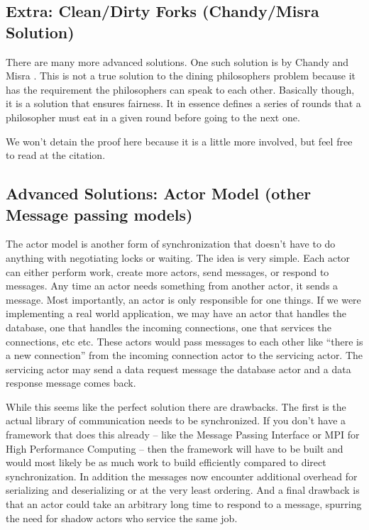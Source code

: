 \subsection{Extra: Clean/Dirty Forks (Chandy/Misra Solution)}

There are many more advanced solutions. One such solution is by Chandy and Misra \cite{Chandy:1984:DPP:1780.1804}. This is not a true solution to the dining philosophers problem because it has the requirement the philosophers can speak to each other. Basically though, it is a solution that ensures fairness. It in essence defines a series of rounds that a philosopher must eat in a given round before going to the next one.

We won't detain the proof here because it is a little more involved, but feel free to read at the citation.

\subsection{Advanced Solutions: Actor Model (other Message passing models)}

The actor model is another form of synchronization that doesn't have to do anything with negotiating locks or waiting. The idea is very simple. Each actor can either perform work, create more actors, send messages, or respond to messages. Any time an actor needs something from another actor, it sends a message. Most importantly, an actor is only responsible for one things.
If we were implementing a real world application, we may have an actor that handles the database, one that handles the incoming connections, one that services the connections, etc etc.
These actors would pass messages to each other like ``there is a new connection'' from the incoming connection actor to the servicing actor.
The servicing actor may send a data request message the database actor and a data response message comes back.

While this seems like the perfect solution there are drawbacks.
The first is the actual library of communication needs to be synchronized.
If you don't have a framework that does this already -- like the Message Passing Interface or MPI for High Performance Computing -- then the framework will have to be built and would most likely be as much work to build efficiently compared to direct synchronization.
In addition the messages now encounter additional overhead for serializing and deserializing or at the very least ordering.
And a final drawback is that an actor could take an arbitrary long time to respond to a message, spurring the need for shadow actors who service the same job.


